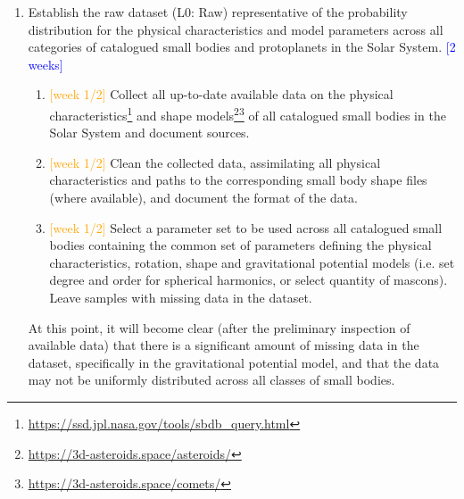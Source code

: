 \begin{enumerate}
    \item Establish the raw dataset (L0: Raw) representative of the probability distribution for the physical characteristics and model parameters across all categories of catalogued small bodies and protoplanets in the Solar System. \textcolor{blue}{[2 weeks]}
          \begin{enumerate}
              \item \textcolor{orange}{[week 1/2]} Collect all up-to-date available data on the physical characteristics\footnote{\url{https://ssd.jpl.nasa.gov/tools/sbdb_query.html}} and shape models\footnote{\label{note1}\url{https://3d-asteroids.space/asteroids/}}\footnote{\label{note2}\url{https://3d-asteroids.space/comets/}} of all catalogued small bodies in the Solar System and document sources. 
              \item \textcolor{orange}{[week 1/2]} Clean the collected data, assimilating all physical characteristics and paths to the corresponding small body shape files (where available), and document the format of the data.
              \item \textcolor{orange}{[week 1/2]} Select a parameter set to be used across all catalogued small bodies containing the common set of parameters defining the physical characteristics, rotation, shape and gravitational potential models (i.e. set degree and order for spherical harmonics, or select quantity of mascons). Leave samples with missing data in the dataset.
          \end{enumerate}
    At this point, it will become clear (after the preliminary inspection of available data) that there is a significant amount of missing data in the dataset, specifically in the gravitational potential model, and that the data may not be uniformly distributed across all classes of small bodies.


\end{enumerate}
